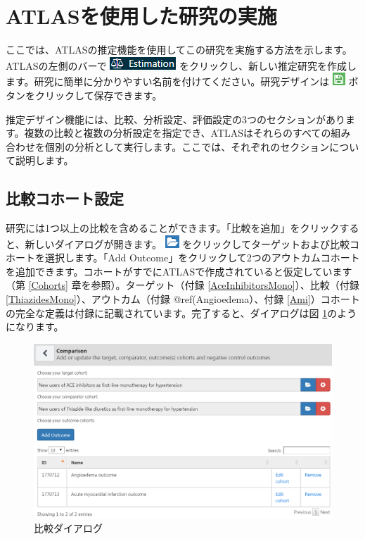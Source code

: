\documentclass[
  11pt]{book}
\theoremstyle{definition}
\theoremstyle{definition}
\theoremstyle{definition}
\theoremstyle{definition}
\theoremstyle{remark}
\begin{document}
\section{ATLASを使用した研究の実施}\label{PleAtlas}

ここでは、ATLASの推定機能を使用してこの研究を実施する方法を示します。ATLASの左側のバーで \includegraphics{images/PopulationLevelEstimation/estimation.png} をクリックし、新しい推定研究を作成します。研究に簡単に分かりやすい名前を付けてください。研究デザインは \includegraphics{images/PopulationLevelEstimation/save.png} ボタンをクリックして保存できます。

推定デザイン機能には、比較、分析設定、評価設定の3つのセクションがあります。複数の比較と複数の分析設定を指定でき、ATLASはそれらのすべての組み合わせを個別の分析として実行します。ここでは、それぞれのセクションについて説明します。

\subsection{比較コホート設定}\label{ComparisonSettings}

研究には1つ以上の比較を含めることができます。「比較を追加」をクリックすると、新しいダイアログが開きます。 \includegraphics{images/PopulationLevelEstimation/open.png} をクリックしてターゲットおよび比較コホートを選択します。「Add Outcome」をクリックして2つのアウトカムコホートを追加できます。コホートがすでにATLASで作成されていると仮定しています（第 \ref{Cohorts} 章を参照）。ターゲット（付録 \ref{AceInhibitorsMono}）、比較（付録 \ref{ThiazidesMono}）、アウトカム（付録 @ref(Angioedema）、付録 \ref{Ami}）コホートの完全な定義は付録に記載されています。完了すると、ダイアログは図 \ref{fig:comparisons}のようになります。

\begin{figure}

{\centering \includegraphics[width=1\linewidth]{images/PopulationLevelEstimation/comparisons} 

}

\caption{比較ダイアログ}\label{fig:comparisons}
\end{figure}
\end{document}
